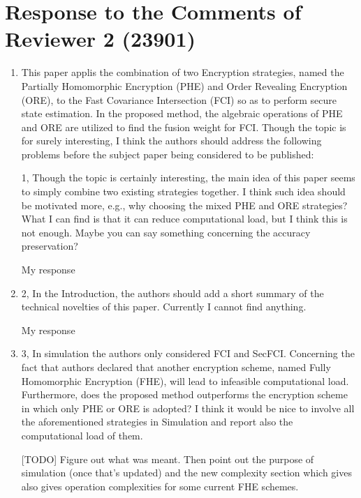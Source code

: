 \documentclass[a4paper]{scrartcl}
\newenvironment{rebuttal}{\begin{enumerate}[label={\color{grey}\thesection.\arabic{enumi}},leftmargin=0pt,ref=\thesection.\arabic{enumi}]}{\end{enumerate}}
\newcommand{\reviewtext}[1]{{\color{nblue} #1}}
\begin{document}
\section*{Response to the Comments of Reviewer 2 (23901)}
\def\thesection{R2}
\begin{rebuttal}
\item \reviewtext{This paper applis the combination of two Encryption strategies, named
the Partially Homomorphic Encryption (PHE) 
and Order Revealing Encryption (ORE), to the Fast Covariance
Intersection (FCI) so as to perform secure state estimation. In the
proposed method, the algebraic operations of PHE and ORE are utilized
to find the fusion weight for FCI. Though the topic is for surely
interesting, I think the authors should address the following problems
before the subject paper being considered to be published:

1, Though the topic is certainly interesting, the main idea of this
paper seems to simply combine two existing strategies together. I think
such idea should be motivated more, e.g., why choosing the mixed PHE
and ORE strategies? What I can find is that it can reduce computational
load, but I think this is not enough. Maybe you can say something
concerning the accuracy preservation? }

My response

\item \reviewtext{2, In the Introduction, the authors should add a short summary of the
technical novelties of this paper. Currently I cannot find anything.}

My response

\item \reviewtext{3, In simulation the authors only considered FCI and SecFCI. Concerning
the fact that authors declared that another encryption scheme, named
Fully Homomorphic Encryption (FHE), will lead to infeasible
computational load. Furthermore, does the proposed method outperforms
the encryption scheme in which only PHE or ORE is adopted? I think it
would be nice to involve all the aforementioned strategies in
Simulation and report also the computational load of them.}

[TODO] Figure out what was meant. Then point out the purpose of simulation (once that's updated) and the new complexity section which gives also gives operation complexities for some current FHE schemes.

\end{rebuttal}

\end{document}
